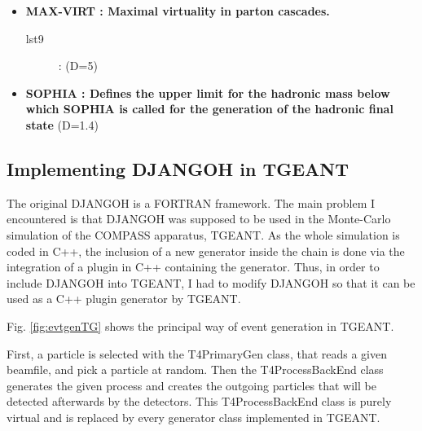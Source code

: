 \documentclass[letterpaper,12pt]{article}
\begin{document}
\begin{itemize}
\begin{description}
\end{description}
\item \textbf{MAX-VIRT : Maximal virtuality in parton cascades.}
\begin{description}
\item[lst9] : (D=5)
\end{description}
\item \textbf{SOPHIA : Defines the upper limit for the hadronic mass below which SOPHIA is
called for the generation of the hadronic final state} (D=1.4)
\end{itemize}

\subsection{Implementing DJANGOH in TGEANT}

The original DJANGOH is a FORTRAN framework. The main problem I encountered is that
DJANGOH was supposed to be used in the Monte-Carlo simulation of the COMPASS apparatus,
TGEANT. As the whole simulation is coded in C++, the inclusion of a new generator inside
the chain is done via the integration of a plugin in C++ containing the generator.
Thus, in order to include DJANGOH into TGEANT, I had to modify DJANGOH so that it
can be used as a C++ plugin generator by TGEANT.

Fig. \ref{fig:evtgenTG} shows the principal way of event generation in TGEANT.

First, a particle is selected with the T4PrimaryGen class, that reads a given beamfile,
and pick a particle at random. Then the T4ProcessBackEnd class generates
the given process and creates the outgoing particles that will be detected afterwards
by the detectors. This T4ProcessBackEnd class is purely virtual and is replaced by
every generator class implemented in TGEANT.
\end{document}
